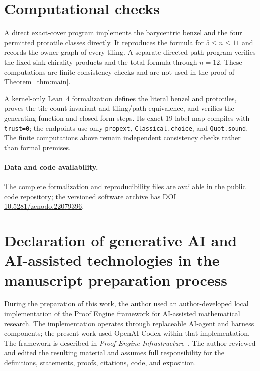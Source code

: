 \documentclass[11pt]{amsart}
\theoremstyle{definition}
\begin{document}
\section{Computational checks}

A direct exact-cover program implements the barycentric benzel and the
four permitted prototile classes directly.  It reproduces the formula for
$5\leq n\leq11$ and records the owner graph of every tiling.  A separate
directed-path program verifies the fixed-sink chirality products and the total
formula through $n=12$.  These computations are finite consistency checks and
are not used in the proof of Theorem~\ref{thm:main}.

A kernel-only Lean~4 formalization defines the literal benzel and prototiles,
proves the tile-count invariant and tiling/path equivalence, and verifies the
generating-function and closed-form steps.  Its exact 19-label map compiles with
\texttt{--trust=0}; the endpoints use only \texttt{propext},
\texttt{Classical.choice}, and \texttt{Quot.sound}.  The finite computations
above remain independent consistency checks rather than formal premises.

\paragraph{Data and code availability.}
The complete formalization and reproducibility files are available in the
\href{https://github.com/crabsatellite/peripheral-benzel-tilings}{public code
repository}; the versioned software archive has DOI
\href{https://doi.org/10.5281/zenodo.22079396}{10.5281/zenodo.22079396}.

\section*{Declaration of generative AI and AI-assisted technologies in the
manuscript preparation process}

During the preparation of this work, the author used an author-developed local
implementation of the Proof Engine framework for AI-assisted mathematical
research.  The implementation operates through replaceable AI-agent and
harness components; the present work used OpenAI Codex within that
implementation.  The framework is described in \emph{Proof Engine
Infrastructure}~\cite{LiProofEngine2026}.  The author reviewed and edited the
resulting material and assumes full responsibility for the definitions,
statements, proofs, citations, code, and exposition.
\end{document}
